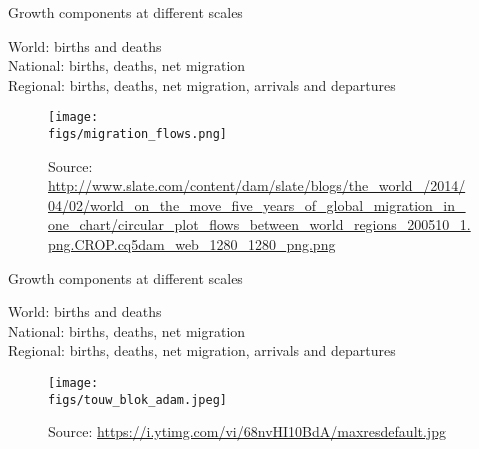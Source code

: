 \documentclass[final, 12pt, aspectratio=169, xcolor={dvipsnames}]{beamer}
\newcommand*{\figs}{../figs}%
\newcommand{\semitransp}[2][35]{\color{fg!#1}#2}
\newcommand{\source}[1]{\caption*{\tiny Source: {#1}} }
\begin{document}
\begin{frame}{Growth components at different scales}
  \noindent
\begin{minipage}[t]{0.48\linewidth}%

  {\semitransp{World: births and deaths}} \\
  {National: births, deaths, net migration} \\
  \semitransp{Regional: births, deaths, net migration, arrivals and departures} \\
  
\end{minipage}%
\hfill%
\begin{minipage}[t]{0.48\linewidth}
  \vspace{-1cm}
  \begin{figure}
    \texttt{[image: \\figs/migration\_flows.png]}
    \source{\url{http://www.slate.com/content/dam/slate/blogs/the_world_/2014/04/02/world_on_the_move_five_years_of_global_migration_in_one_chart/circular_plot_flows_between_world_regions_200510_1.png.CROP.cq5dam_web_1280_1280_png.png}}
  \end{figure}
\end{minipage}    
  
\end{frame}

\begin{frame}{Growth components at different scales}
  \noindent
\begin{minipage}[t]{0.48\linewidth}%

  {\semitransp{World: births and deaths}} \\
  {\semitransp{National: births, deaths, net migration}} \\
  {Regional: births, deaths, net migration, arrivals and departures} \\
  
\end{minipage}%
\hfill%
\begin{minipage}[t]{0.48\linewidth}
  \begin{figure}
    \texttt{[image: \\figs/touw\_blok\_adam.jpeg]}
    \source{\url{https://i.ytimg.com/vi/68nvHI10BdA/maxresdefault.jpg}}
  \end{figure}
\end{minipage}    
  
\end{frame}
\end{document}
